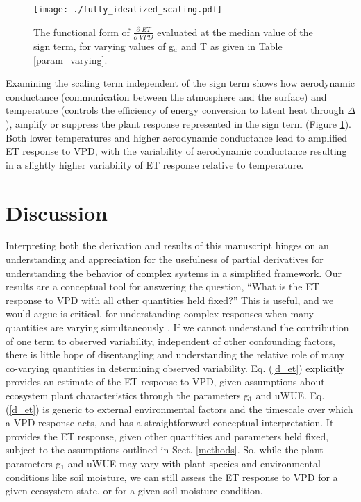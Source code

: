 \documentclass[12pt]{article}
\begin{document}
\begin{figure}
  \centering \texttt{[image: ./fully\_idealized\_scaling.pdf]}
  \caption{The functional form of $\frac{\partial \; ET}{\partial
      \; VPD}$ evaluated at the median value of the sign term, for
    varying values of g$_a$ and T as given in Table \ref{param_varying}.}
  \label{scaling}
\end{figure}

Examining the scaling term independent of the sign term shows how
aerodynamic conductance (communication between the atmosphere and the
surface) and temperature (controls the efficiency of energy conversion
to latent heat through $\Delta$), amplify or suppress the plant
response represented in the sign term (Figure \ref{scaling}). Both
lower temperatures and higher aerodynamic conductance lead to
amplified ET response to VPD, with the variability of aerodynamic
conductance resulting in a slightly higher variability of ET response
relative to temperature.

\section{Discussion}
\label{discussion}

Interpreting both the derivation and results of this manuscript hinges
on an understanding and appreciation for the usefulness of partial
derivatives for understanding the behavior of complex systems in a
simplified framework. Our results are a conceptual tool for answering
the question, ``What is the ET response to VPD with all other
quantities held fixed?'' This is useful, and we would argue is
critical, for understanding complex responses when many quantities are
varying simultaneously \cite{Zhou_2019}. If we cannot understand the
contribution of one term to observed variability, independent of other
confounding factors, there is little hope of disentangling and
understanding the relative role of many co-varying quantities in
determining observed variability.  Eq. (\ref{d_et}) explicitly
provides an estimate of the ET response to VPD, given assumptions
about ecosystem plant characteristics through the parameters g$_1$ and
uWUE. Eq. (\ref{d_et}) is generic to external environmental factors
and the timescale over which a VPD response acts, and has a
straightforward conceptual interpretation. It provides the ET
response, given other quantities and parameters held fixed, subject to
the assumptions outlined in Sect. \ref{methods}. So, while the plant
parameters g$_1$ and uWUE may vary with plant species and
environmental conditions like soil moisture, we can still assess the
ET response to VPD for a given ecosystem state, or for a given soil
moisture condition.
\end{document}
